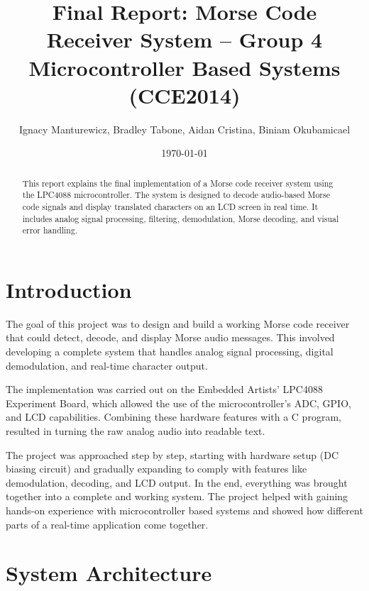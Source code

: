 \documentclass{article}
\title{Final Report: Morse Code Receiver System -- Group 4 \\ \large Microcontroller Based Systems (CCE2014)}
\author{Ignacy Manturewicz, Bradley Tabone, Aidan Cristina, Biniam Okubamicael}
\date{\today}
\begin{document}
\maketitle

\begin{abstract}
This report explains the final implementation of a Morse code receiver system using the
 LPC4088 microcontroller. The system is designed to decode audio-based Morse code signals 
 and display translated characters on an LCD screen in real time. 
 It includes analog signal processing, filtering, demodulation, Morse decoding, 
 and visual error handling.
\end{abstract}

\section{Introduction}
    The goal of this project was to design and build a working Morse code receiver that could detect, decode, 
and display Morse audio messages. This involved developing a complete system that handles analog signal processing, 
digital demodulation, and real-time character output.

The implementation was carried out on the Embedded Artists’ LPC4088 Experiment Board, which allowed the use of
the microcontroller’s ADC, GPIO, and LCD capabilities. Combining these hardware features 
with a C program, resulted in turning the raw analog audio into readable text.

The project was approached step by step, starting with hardware setup (DC biasing circuit) and 
gradually expanding to comply with features like demodulation, decoding, and LCD output. In the end, everything
was brought together into a complete and working system. 
The project helped with gaining hands-on experience with microcontroller based systems and showed
how different parts of a real-time application come together.

\section{System Architecture}
\end{document}
